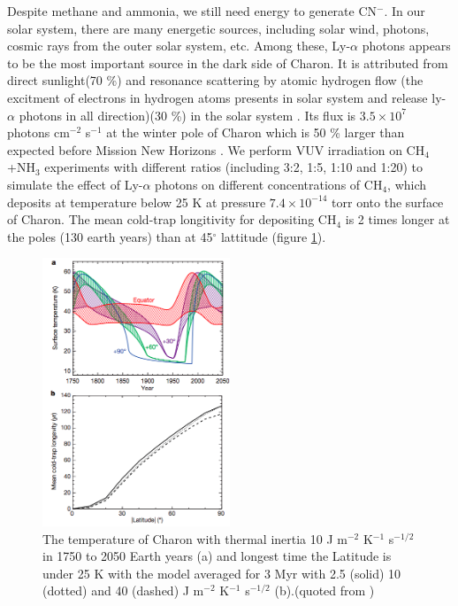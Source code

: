 Despite methane and ammonia, we still need energy to generate CN$^-$. In our solar system, there are many energetic sources, including solar wind, photons, cosmic rays from the outer solar system, etc. Among these, Ly-$\alpha$ photons appears to be the most important source in the dark side of Charon. It is attributed from direct sunlight(70 \%) and resonance scattering by atomic hydrogen flow (the excitment of electrons in hydrogen atoms presents in solar system and release ly-$\alpha$ photons in all direction)(30 \%) in the solar system \cite{grundy2016formation}. Its flux is $3.5 \times 10^7$ photons cm$^{-2}$ s$^{-1}$ at the winter pole of Charon \cite{grundy2016formation} which is 50 \% larger than expected before Mission New Horizons \cite{gladstone2015lyalpha}. We perform VUV irradiation on CH$_4$+NH$_3$ experiments with different ratios (including 3:2, 1:5, 1:10 and 1:20) to simulate the effect of Ly-$\alpha$ photons on different concentrations of CH$_4$, which deposits at temperature below 25 K at pressure $7.4 \times 10^{-14}$ torr onto the surface of Charon. The mean cold-trap longitivity for depositing CH$_4$ is 2 times longer at the poles (130 earth years) than at 45$^{\circ}$ lattitude \cite{grundy2016formation} (figure \ref{fig:Charon_thermal}).\\

\begin{figure}
\centering
\includegraphics[width=0.5\textwidth]{figures/chapter1/thermal.png}
\caption{The temperature of Charon with thermal inertia 10 J m$^{-2}$ K$^{-1}$ s$^{-1/2}$ in 1750 to 2050 Earth years (a) and longest time the Latitude is under 25 K with the model averaged for 3 Myr with 2.5 (solid) 10 (dotted) and 40 (dashed) J m$^{-2}$ K$^{-1}$ s$^{-1/2}$ (b).(quoted from \cite{grundy2016formation})}
\label{fig:Charon_thermal}
\end{figure}

